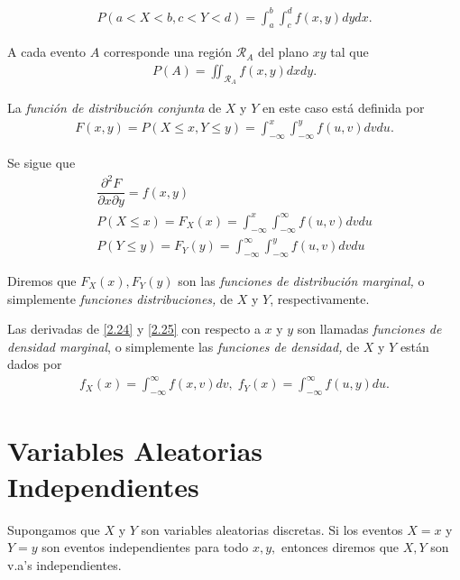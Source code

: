 	\begin{align}
		\label{2.20}
		P(a<X<b,c<Y<d)=\int_{a}^{b}\int_{c}^{d}f(x,y)dydx.
	\end{align}



	A cada evento $A$ corresponde una región $\mathcal{R}_{A}$ del plano $xy$ tal que
	\begin{align}
	  \label{2.21}
		P(A)=\iint_{\mathcal{R}_{A}}f(x,y)dxdy.
	\end{align}



	La \emph{función de distribución conjunta} de $X$ y $Y$ en este caso está definida por
	\begin{align}
		\label{2.22}
	F(x,y)=P(X\leq x, Y\leq y)=
	\int_{-\infty}^{x} \int_{-\infty}^{y} f(u,v)dvdu.
	\end{align}



	Se sigue que
	\begin{align}
	 \dfrac{\partial^{2}F}{\partial x \partial y}=
	 f(x,y)  \label{2.23} \\
	  	 P(X\leq x)=F_{X}(x)=\int_{-\infty}^{x}\int_{-\infty}^{\infty} f(u,v)dvdu \label{2.24} \\
	 	 P(Y\leq y)=F_{Y}(y)=\int_{-\infty}^{\infty}\int_{-\infty}^{y} f(u,v)dvdu \label{2.25}
	\end{align}



 Diremos que $F_{X}(x),F_{Y}(y)$ son las \emph{funciones de distribución marginal,} o simplemente \emph{funciones distribuciones,} de $X$ y $Y$, respectivamente.


 Las derivadas de \eqref{2.24} y \eqref{2.25} con respecto a $x$ y $y$ son llamadas \emph{funciones de densidad marginal}, o simplemente las \emph{funciones de densidad,} de $X$ y $Y$ están dados por
 \begin{align}
 \label{2.26}
 \displaystyle
  f_{X}(x)=\int_{-\infty}^{\infty}f(x,v)dv, \;
  f_{Y}(x)=\int_{-\infty}^{\infty}f(u,y)du.
 \end{align}



\section{Variables Aleatorias Independientes}

 Supongamos que $X$ y $Y$ son variables aleatorias discretas.  Si los eventos $X=x$ y $Y=y$ son eventos independientes para todo $x,y,$  entonces diremos que $X,Y$ son v.a's independientes.


